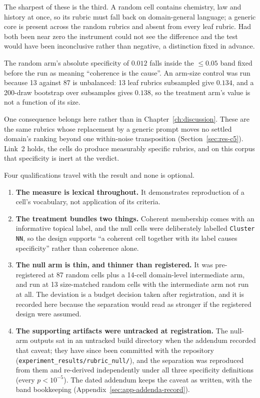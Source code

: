 The sharpest of these is the third. A random cell contains chemistry,
law and history at once, so its rubric must fall back on domain-general
language; a generic core is present across the random rubrics and
absent from every leaf rubric. Had both been near zero the instrument
could not see the difference and the test would have been inconclusive
rather than negative, a distinction fixed in advance.

The random arm's absolute specificity of $0.012$ falls inside the
$\leq 0.05$ band fixed before the run as meaning ``coherence is the
cause''. An arm-size control was run because 13 against 87 is
unbalanced: 13 leaf rubrics subsampled give $0.134$, and a 200-draw
bootstrap over subsamples gives $0.138$, so the treatment arm's value
is not a function of its size.

One consequence belongs here rather than in
Chapter~\ref{ch:discussion}. These are the same rubrics whose
replacement by a generic prompt moves no settled domain's ranking
beyond one within-noise transposition (Section~\ref{sec:res-c5}).
Link~2 holds, the
cells do produce measurably specific rubrics, and on this corpus that
specificity is inert at the verdict.

Four qualifications travel with the result and none is optional.
\begin{enumerate}
\item \textbf{The measure is lexical throughout.} It demonstrates
reproduction of a cell's vocabulary, not application of its criteria.
\item \textbf{The treatment bundles two things.} Coherent membership
comes with an informative topical label, and the null cells were
deliberately labelled \texttt{Cluster NN}, so the design supports ``a
coherent cell together with its label causes specificity'' rather than
coherence alone.
\item \textbf{The null arm is thin, and thinner than registered.} It
was pre-registered at 87 random cells plus a 14-cell domain-level
intermediate arm, and run at 13 size-matched random cells with the
intermediate arm not run at all. The deviation is a budget decision
taken after registration, and it is recorded here because the
separation would read as stronger if the registered design were
assumed.
\item \textbf{The supporting artifacts were untracked at
registration.} The null-arm outputs sat in an untracked build
directory when the addendum recorded that caveat; they have since
been committed with the repository
(\texttt{experiment\_results/rubric\_null/}), and the separation was
reproduced from them and re-derived independently under all three
specificity definitions (every $p < 10^{-5}$). The dated addendum
keeps the caveat as written, with the band bookkeeping
(Appendix~\ref{sec:app-addenda-record}).
\end{enumerate}


